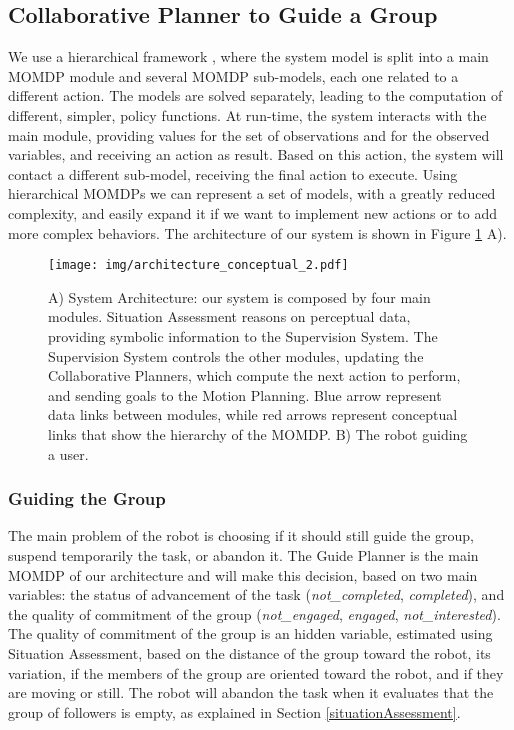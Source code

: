 \subsection{Collaborative Planner to Guide a Group}
We use a hierarchical framework \cite{pineau2001hierarchical}, where the system model is split into a main MOMDP module and several MOMDP sub-models, each one related to a different action. The models are solved separately, leading to the computation of different, simpler, policy functions. At run-time, the system interacts with the main module, providing values for the set of observations and for the observed variables, and receiving an action as result. Based on this action, the system will contact a different sub-model, receiving the final action to execute. Using hierarchical MOMDPs we can represent a set of models, with a greatly reduced complexity, and easily expand it if we want to implement new actions or to add more complex behaviors.  The architecture of our system is shown in Figure \ref{architecture} A).


\begin{figure}[h!]
 \vspace{-20pt}
\caption{A) System Architecture: our system is composed by four main modules. Situation Assessment reasons on perceptual data, providing symbolic information to the Supervision System. The Supervision System controls the other modules, updating the Collaborative Planners, which compute the next action to perform, and sending goals to the Motion Planning. Blue arrow represent data links between modules, while red arrows represent conceptual links that show the hierarchy of the MOMDP. B) The robot guiding a user.}
\label{architecture}

  \centering
\texttt{[image: img/architecture\_conceptual\_2.pdf]}
\vspace{-20pt}
\end{figure}

\vspace{-5pt}
\subsubsection{Guiding the Group}
The main problem of the robot is choosing if it should still guide the group, suspend temporarily the task, or abandon it. The Guide Planner is the main MOMDP of our architecture and will make this decision, based on two main variables: the status of advancement of the task (\textit{not\_completed}, \textit{completed}), and the quality of commitment of the group (\textit{not\_engaged}, \textit{engaged}, \textit{not\_interested}). The quality of commitment of the group is an hidden variable, estimated using  Situation Assessment, based on the distance of the group toward the robot, its variation, if the members of the group are oriented toward the robot, and if they are moving or still. The robot will abandon the task when it evaluates that the group of followers is empty, as explained in Section \ref{situationAssessment}.

